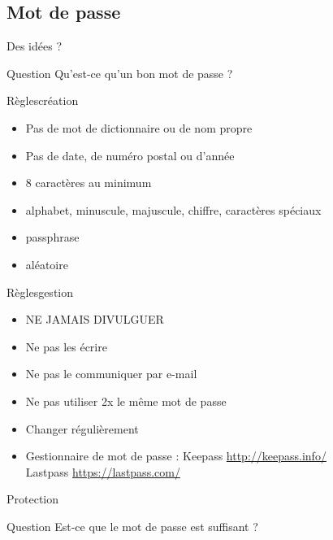 \documentclass[12pt]{beamer}
\begin{document}
	\subsection{Mot de passe}	
		
		\begin{frame}{Des idées ?}
			\begin{exampleblock}{Question}
				Qu'est-ce qu'un bon mot de passe ?
			\end{exampleblock}
		\end{frame}
		
		\begin{frame}{Règles}{création}
			\begin{itemize}
				\item Pas de mot de dictionnaire ou de nom propre
				\item Pas de date, de numéro postal ou d'année
				\item 8 caractères au minimum
				\item alphabet, minuscule, majuscule, chiffre, caractères spéciaux
				\item passphrase
				\item aléatoire
			\end{itemize}
		\end{frame}
		
		\begin{frame}{Règles}{gestion}
			\begin{itemize}			
				\item \alert{NE JAMAIS DIVULGUER}
				\item Ne pas les écrire
				\item Ne pas le communiquer par e-mail
				\item Ne pas utiliser 2x le même mot de passe
				\item Changer régulièrement
				\item Gestionnaire de mot de passe : Keepass \url{http://keepass.info/} \\
					Lastpass \url{https://lastpass.com/}
			\end{itemize}
		\end{frame}
		
		\begin{frame}{Protection}
			\begin{exampleblock}{Question}
				Est-ce que le mot de passe est suffisant ?
			\end{exampleblock}			
		\end{frame}


\end{document}
